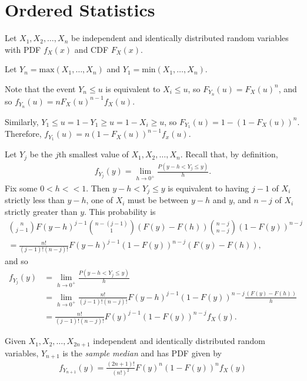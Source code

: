 \section{Ordered Statistics}

Let $X_1, X_2, \ldots, X_n$ be independent and identically distributed random variables with PDF $f_X(x)$ and CDF $F_X(x)$.

Let $Y_n = \mathrm{max}(X_1, \ldots, X_n)$ and $Y_1 = \mathrm{min}(X_1, \ldots, X_n)$.

Note that the event $Y_n \leq u$ is equivalent to $X_i \leq u$, so $F_{Y_n}(u) = F_X(u)^{n}$, and so $f_{Y_n}(u) = nF_X(u)^{n-1}f_X(u)$.

Similarly, $Y_1 \leq u = 1 - Y_1 \geq u = 1 - X_i \geq u$, so $F_{Y_1}(u) = 1 - \left(1 - F_X(u)\right)^{n}$. Therefore, $f_{Y_1}(u) = n\left(1-F_X(u)\right)^{n-1}f_x(u)$.

Let $Y_j$ be the $j$th smallest value of $X_1, X_2, \ldots, X_n$. Recall that, by definition,
\begin{align*}
    f_{Y_j}(y) = \lim_{h \to 0^{+}}\frac{P(y-h < Y_j \leq y)}{h}.
\end{align*}
Fix some $0 < h << 1$. Then $y-h < Y_j \leq y$ is equivalent to having $j-1$ of $X_i$ strictly less than $y-h$, one of $X_i$ must be between $y-h$ and $y$, and $n-j$ of $X_i$ strictly greater than $y$. This probability is
\begin{align*}
    \binom{n}{j-1}F(y-h)^{j-1}\binom{n-(j-1)}{1}\left(F(y)-F(h)\right)\binom{n-j}{n-j}\left(1-F(y)\right)^{n-j} \\
    = \frac{n!}{(j-1)!(n-j)!}F(y-h)^{j-1}\left(1-F(y)\right)^{n-j}\left(F(y)-F(h)\right),
\end{align*}
and so
\begin{align*}
    f_{Y_j}(y) &= \lim_{h \to 0^{+}}\frac{P(y-h<Y_j\leq y)}{h} \\
    &= \lim_{h \to 0^{+}}\frac{n!}{(j-1)!(n-j)!}F(y-h)^{j-1}\left(1-F(y)\right)^{n-j}\frac{\left(F(y)-F(h)\right)}{h} \\
    &= \frac{n!}{(j-1)!(n-j)!}F(y)^{j-1}\left(1-F(y)\right)^{n-j}f_X(y).
\end{align*}

\begin{defn}
    Given $X_1, X_2, \ldots, X_{2n+1}$ independent and identically distributed random variables, $Y_{n+1}$ is the \emph{sample median} and has PDF given by
    \begin{align*}
        f_{Y_{n+1}}(y) = \frac{(2n+1)!}{(n!)^2}F(y)^{n}\left(1-F(y)\right)^{n}f_X(y)
    \end{align*}
\end{defn}


